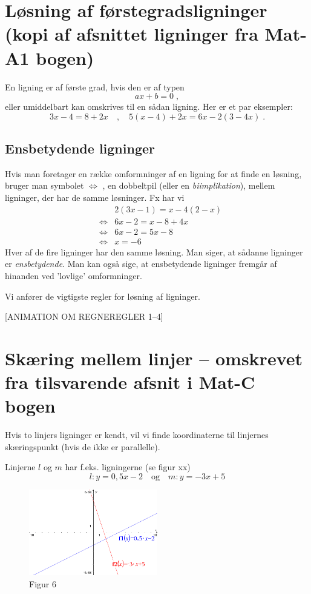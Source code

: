\documentclass[12pt,oneside,a4paper]{article}
\newcommand{\bas}{\begin{eqnarray*}}
\newcommand{\eas}{\end{eqnarray*}}
\begin{document}
\section{Løsning af førstegradsligninger (kopi af afsnittet ligninger fra Mat-A1 bogen)}
En ligning er af første grad, hvis den er af typen
$$
ax + b = 0\; ,
$$
eller umiddelbart kan omskrives til en sådan ligning. Her er et par eksempler:
$$
3x - 4 = 8 + 2x \quad , \quad 5(x - 4) + 2x = 6x - 2(3 - 4x)\; .
$$

\subsection{Ensbetydende ligninger}
Hvis man foretager en række omformninger af en ligning for at finde en løsning,
bruger man symbolet $\iff$ , en dobbeltpil (eller en {\em biimplikation}), mellem
ligninger, der har de samme løsninger. Fx har vi
\bas
&& 2(3x - 1) = x - 4(2 - x)\\
&\iff& 6x - 2 = x - 8 + 4x\\
&\iff& 6x - 2 = 5x - 8 \\
&\iff& x = -6 
\eas
Hver af de fire ligninger har den samme løsning. Man siger, at sådanne
ligninger er {\em ensbetydende}. Man kan også sige, at ensbetydende ligninger fremgår
af hinanden ved ’lovlige’ omformninger.

Vi anfører de vigtigste regler for løsning af ligninger.

[ANIMATION OM REGNEREGLER 1--4]


\section{Skæring mellem linjer -- omskrevet fra tilsvarende afsnit i Mat-C bogen}
Hvis to linjers ligninger er kendt, vil vi finde koordinaterne til linjernes
skæringspunkt (hvis de ikke er parallelle).

Linjerne $l$ og $m$ har f.eks. ligningerne (se figur xx)
$$
l: y=0,5x-2\quad{\mbox{og}}\quad m: y=-3x+5
$$

\begin{figure}[ht]
    \centering
    \includegraphics[width=0.5\textwidth]{fig6}
    \caption{Figur 6}
    \label{fig6}
\end{figure}
\end{document}
